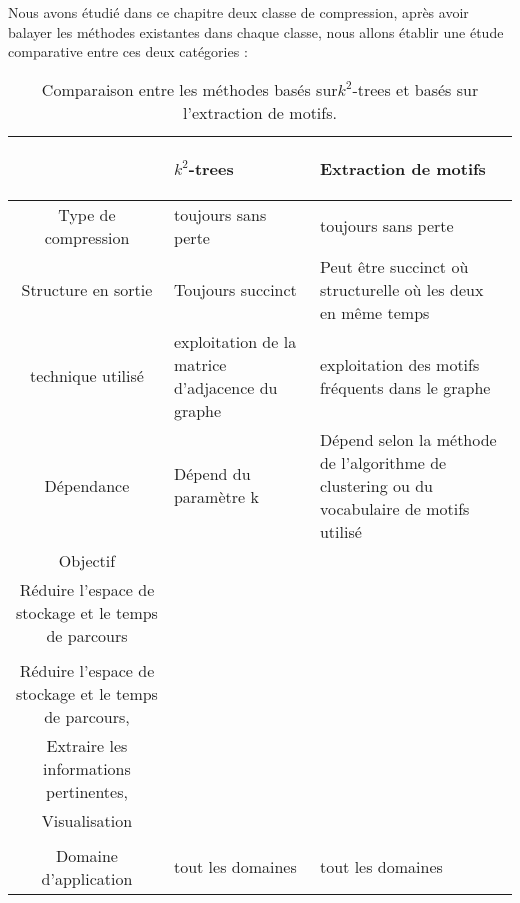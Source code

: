 Nous avons étudié dans ce chapitre deux classe de compression, après avoir balayer les méthodes existantes dans chaque classe, nous allons établir une étude comparative entre ces deux catégories :
 
\begin{table}[H]
\begin{tabular}{|c|p{6cm}|p{6cm}|}

\hline & \begin{center}
\textbf{$k^2$-trees}
\end{center}     &  \begin{center} \textbf{Extraction de motifs} \end{center}  \\
										
										
\hline Type de compression & toujours sans perte & toujours sans perte \\
\hline Structure en sortie & Toujours succinct & Peut être succinct où structurelle où les deux en même temps\\

\hline technique utilisé & exploitation de la matrice d'adjacence du graphe & exploitation des motifs fréquents dans le graphe\\

\hline Dépendance & Dépend du paramètre k & Dépend selon la méthode de l'algorithme de clustering ou du vocabulaire de motifs utilisé  \\

\hline Objectif & 
\begin{minipage}[t]{0.35\textwidth}
  			Compression,\\
  			Réduire l'espace de stockage et le temps de parcours\\
  \end{minipage}
  &
  \begin{minipage}[t]{0.35\textwidth}
  			Compression,\\
  			Réduire l'espace de stockage et le temps de parcours,\\
  			Extraire les informations pertinentes, \\
  			Visualisation \\
  \end{minipage}
  \\
  \hline Domaine d'application & tout les domaines & tout les domaines \\
  \hline
\end{tabular}
									\caption{Comparaison entre les méthodes basés sur$k^2$-trees et basés sur l'extraction de motifs.}									
									
								\end{table}
